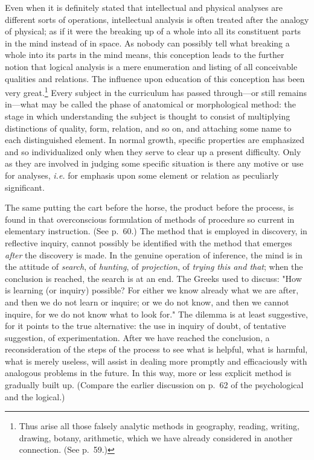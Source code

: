 \documentclass[letterpaper]{book}
\begin{document}


Even when it is definitely stated that intellectual and physical
analyses are different sorts of operations, intellectual analysis is
often treated after the analogy of physical; as if it were the breaking
up of a whole into all its constituent parts in the mind instead of in
space. As nobody can possibly tell what breaking a whole into its parts
in the mind means, this conception leads to the further notion that
logical analysis is a mere enumeration and listing of all conceivable
qualities and
relations.
The influence upon education of this conception has been very
great.\footnote{
Thus arise all those falsely analytic methods in geography, reading,
writing, drawing, botany, arithmetic, which we have already considered
in another connection. (See p.\ 59.)
}
Every subject in the curriculum has passed through---or still remains
in---what may be called the phase of anatomical or morphological method:
the stage in which understanding the subject is thought to consist of
multiplying distinctions of quality, form, relation, and so on, and
attaching some name to each distinguished element. In normal growth,
specific properties are emphasized and so individualized only when they
serve to clear up a present difficulty. Only as they are involved in
judging some specific situation is there any motive or use for analyses,
\emph{i.e.} for emphasis upon some element or relation as peculiarly
significant.


The same putting the cart before the horse, the product before the
process, is found in that overconscious formulation of methods of
procedure so current in elementary instruction. (See p.\ 60.) The method
that is employed in discovery, in reflective inquiry, cannot possibly be
identified with the method that emerges \emph{after} the discovery is
made. In the genuine operation of inference, the mind is in the attitude
of \emph{search}, of \emph{hunting}, of \emph{projection}, of
\emph{trying this and that}; when the conclusion is reached, the search
is at an end. The Greeks used to discuss: "How is learning (or inquiry)
possible? For either we know already what we are after, and then we do
not learn or inquire; or we do not know, and then we cannot inquire, for
we do not know what to look for." The dilemma is at least suggestive,
for it points to the true alternative: the use in inquiry of doubt, of
tentative suggestion, of
experimentation.
After we have reached the conclusion, a reconsideration of the steps of
the process to see what is helpful, what is harmful, what is merely
useless, will assist in dealing more promptly and efficaciously with
analogous problems in the future. In this way, more or less explicit
method is gradually built up. (Compare the earlier discussion on p.\ 62
of the psychological and the logical.)
\end{document}
